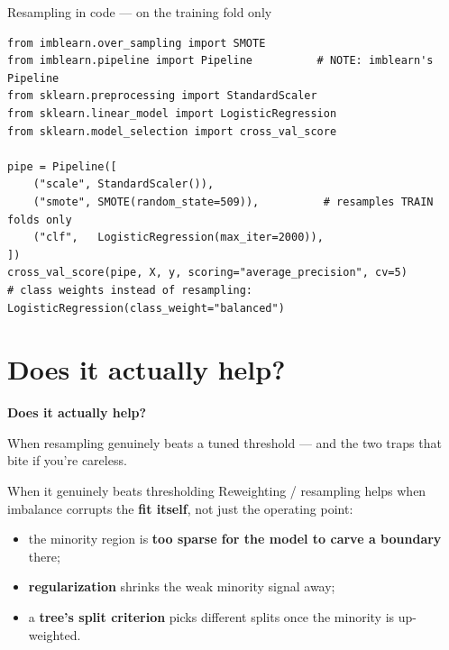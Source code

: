 \documentclass[aspectratio=169]{beamer}
\begin{document}
\begin{frame}[fragile]{Resampling in code --- on the training fold only}
\begin{lstlisting}
from imblearn.over_sampling import SMOTE
from imblearn.pipeline import Pipeline          # NOTE: imblearn's Pipeline
from sklearn.preprocessing import StandardScaler
from sklearn.linear_model import LogisticRegression
from sklearn.model_selection import cross_val_score

pipe = Pipeline([
    ("scale", StandardScaler()),
    ("smote", SMOTE(random_state=509)),          # resamples TRAIN folds only
    ("clf",   LogisticRegression(max_iter=2000)),
])
cross_val_score(pipe, X, y, scoring="average_precision", cv=5)
# class weights instead of resampling:
LogisticRegression(class_weight="balanced")
\end{lstlisting}
  \vskip 2pt
\end{frame}

\section{Does it actually help?}

\begin{frame}[plain]
  \vfill
  \begin{center}
    {\Large\color{popblue}\textbf{Does it actually help?}}\\[0.9em]
    \begin{minipage}{0.82\textwidth}\centering\small
      When resampling genuinely beats a tuned threshold --- and the two traps that bite if you're
      careless.
    \end{minipage}
  \end{center}
  \vfill
\end{frame}

\begin{frame}{When it genuinely beats thresholding}
  Reweighting / resampling helps when imbalance corrupts the \textbf{fit itself}, not just the
  operating point:
  \begin{itemize}\small
    \item the minority region is \textbf{too sparse for the model to carve a boundary} there;
    \item \textbf{regularization} shrinks the weak minority signal away;
    \item a \textbf{tree's split criterion} picks different splits once the minority is up-weighted.
  \end{itemize}
  \vfill
\end{frame}
\end{document}
